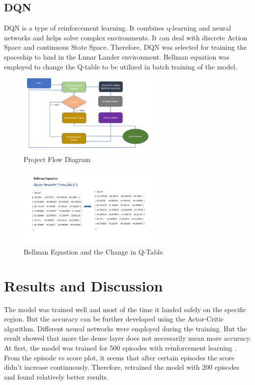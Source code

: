 \documentclass[conference]{IEEEtran}
\begin{document}
\subsection{DQN}
DQN is a type of reinforcement learning. It combines q-learning and neural networks and helps solve complex environments. It can deal with discrete Action Space and continuous State Space. Therefore, DQN was selected for training the spaceship to land in the Lunar Lander environment. Bellman equation was employed to change the Q-table to be utilized in batch training of the model.

\begin{figure}[hbtp]
\centerline{\includegraphics[width=200pt]{images/flow.png}}
\caption{Project Flow Diagram}
\label{FlowDiagram}
\end{figure}

\begin{figure}[hbtp]
\centerline{\includegraphics[width=200pt]{images/bellman.png}}
\caption{Bellman Equation and the Change in Q-Table}
\label{Bellman}
\end{figure}

\section{Results and Discussion}
The model was trained well and most of the time it landed safely on the specific region. But the accuracy can be further developed using the Actor-Critic algorithm. Different neural networks were employed during the training. But the result showed that more the dense layer does not necessarily mean more accuracy. At first, the model was trained for 500 episodes with reinforcement learning \cite{b10}. From the episode vs score plot, it seems that after certain episodes the score didn’t increase continuously. Therefore, retrained the model with 200 episodes and found relatively better results. \\ \\ \\ \\
\end{document}
